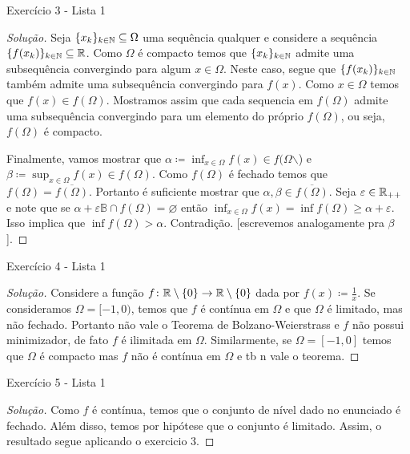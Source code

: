 \documentclass[12pt,twoside,a4paper]{article}
\begin{document}
\begin{problema}
Exercício 3 - Lista 1 
\end{problema}
\begin{proof}[Solução]
 
Seja \(\{x_k\}_{k\in\mathbb{N}}\subseteq \Omega\) uma sequência qualquer e
considere a sequência \(\{f(x_k)\}_{k\in\mathbb{N}}\subseteq\mathbb{R}\). Como
\(\Omega\) é compacto temos que \(\{x_k\}_{k\in \mathbb{N}}\) admite uma
subsequência convergindo para algum \(x\in\Omega\). Neste caso, segue que
\(\{f(x_k)\}_{k\in\mathbb{N}}\) também admite uma subsequência convergindo
para \(f(x)\). Como \(x\in \Omega\) temos que
\(f(x)\in f(\Omega)\). Mostramos
assim que cada sequencia em \(f(\Omega)\) admite uma
subsequência convergindo
para um elemento do próprio \(f(\Omega)\), ou seja, \(f(\Omega)\) é
compacto.

Finalmente, vamos mostrar que \(\alpha\coloneqq\inf_{x\in\Omega}f(x)\in
f(\Omega\)$\backslash$) e
\(\beta\coloneqq\sup_{x\in\Omega}f(x)\in f(\Omega)\).
Como \(f(\Omega)\) é fechado temos que
\(f(\Omega)=\overline{f(\Omega)}\). Portanto é suficiente mostrar que 
\(\alpha,\beta\in\overline{f(\Omega)}\). Seja
\(\varepsilon\in\mathbb{R}_{++}\) e note que se
\(\alpha +\varepsilon\mathbb{B}\cap f(\Omega)=\varnothing\)
então \(\inf_{x\in\Omega}f(x)=\inf f(\Omega)\geq\alpha+\varepsilon\).
Isso implica que \(\inf f(\Omega) > \alpha\).
Contradição. [escrevemos analogamente pra \(\beta\)].
\end{proof}

\begin{problema}
Exercício 4 - Lista 1
\end{problema}
\begin{proof}[Solução]
  Considere a função
  \(f\colon\mathbb{R}\setminus\{0\}\to\mathbb{R}\setminus\{0\}\)
  dada por \(f(x)\coloneqq\frac{1}{x}\). Se consideramos
  \(\Omega=[-1,0)\), temos que \(f\) é contínua em \(\Omega\) e
  que \(\Omega\) é limitado, mas não fechado.
  Portanto não vale o Teorema de Bolzano-Weierstrass e \(f\) não possui
  minimizador, de fato \(f\) é ilimitada em \(\Omega\).
  Similarmente, se \(\Omega=[-1,0]\) temos que \(\Omega\) é compacto
  mas \(f\) não é contínua em \(\Omega\) e tb n vale o teorema.
\end{proof}

\begin{problema}
Exercício 5 - Lista 1   
\end{problema}
\begin{proof}[Solução]
  Como \(f\) é contínua, temos que o conjunto de nível
  dado no enunciado é fechado. Além disso, temos
  por hipótese que o conjunto é limitado. Assim, o
  resultado segue aplicando o exercicio 3.
\end{proof}
\end{document}
